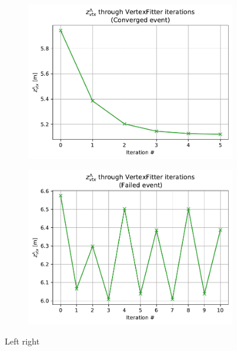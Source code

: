 \begin{figure}[t]
	\centering
	\begin{subfigure}{.45\textwidth}
		\includegraphics[width=\textwidth]{graphics/03-vertex_reconstruction/evt_converged_z_iter.pdf}
		\caption{}
		\label{fig:z_iter_conv}
	\end{subfigure}
	\begin{subfigure}{.45\textwidth}
		\includegraphics[width=\textwidth]{graphics/03-vertex_reconstruction/evt_failed_z_iter.pdf}
		\caption{}
		\label{fig:z_iter_failed}
	\end{subfigure}
	\caption[A and b.]{Left right}
	\label{fig:z_iter_conv_vs_failed}
\end{figure}

